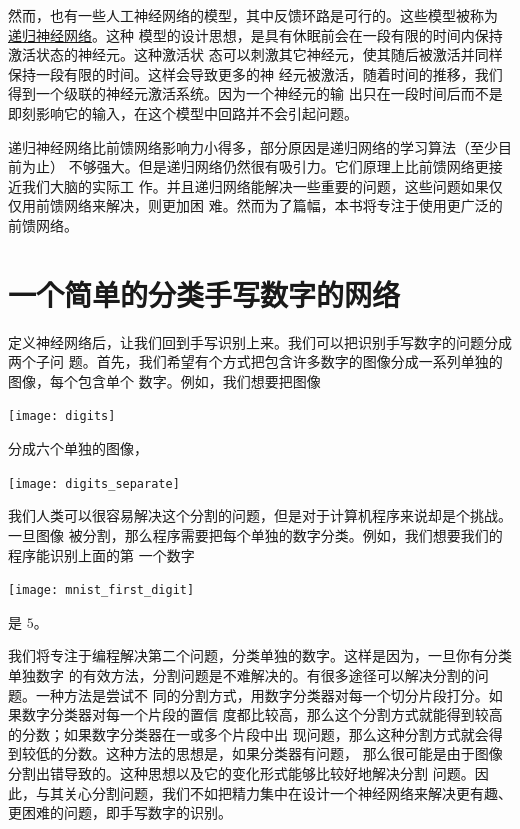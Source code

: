 然而，也有一些人工神经网络的模型，其中反馈环路是可行的。这些模型被称为%
\href{http://en.wikipedia.org/wiki/Recurrent_neural_network}{递归神经网络}。这种
模型的设计思想，是具有休眠前会在一段有限的时间内保持激活状态的神经元。这种激活状
态可以刺激其它神经元，使其随后被激活并同样保持一段有限的时间。这样会导致更多的神
经元被激活，随着时间的推移，我们得到一个级联的神经元激活系统。因为一个神经元的输
出只在一段时间后而不是即刻影响它的输入，在这个模型中回路并不会引起问题。

递归神经网络比前馈网络影响力小得多，部分原因是递归网络的学习算法（至少目前为止）
不够强大。但是递归网络仍然很有吸引力。它们原理上比前馈网络更接近我们大脑的实际工
作。并且递归网络能解决一些重要的问题，这些问题如果仅仅用前馈网络来解决，则更加困
难。然而为了篇幅，本书将专注于使用更广泛的前馈网络。

\section{一个简单的分类手写数字的网络}

定义神经网络后，让我们回到手写识别上来。我们可以把识别手写数字的问题分成两个子问
题。首先，我们希望有个方式把包含许多数字的图像分成一系列单独的图像，每个包含单个
数字。例如，我们想要把图像
\begin{center}
  \texttt{[image: digits]}
\end{center}
分成六个单独的图像，
\begin{center}
  \texttt{[image: digits\_separate]}
\end{center}

我们人类可以很容易解决这个分割的问题，但是对于计算机程序来说却是个挑战。一旦图像
被分割，那么程序需要把每个单独的数字分类。例如，我们想要我们的程序能识别上面的第
一个数字
\begin{center}
  \texttt{[image: mnist\_first\_digit]}
\end{center}
是 $5$。

我们将专注于编程解决第二个问题，分类单独的数字。这样是因为，一旦你有分类单独数字
的有效方法，分割问题是不难解决的。有很多途径可以解决分割的问题。一种方法是尝试不
同的分割方式，用数字分类器对每一个切分片段打分。如果数字分类器对每一个片段的置信
度都比较高，那么这个分割方式就能得到较高的分数；如果数字分类器在一或多个片段中出
现问题，那么这种分割方式就会得到较低的分数。这种方法的思想是，如果分类器有问题，
那么很可能是由于图像分割出错导致的。这种思想以及它的变化形式能够比较好地解决分割
问题。因此，与其关心分割问题，我们不如把精力集中在设计一个神经网络来解决更有趣、
更困难的问题，即手写数字的识别。

